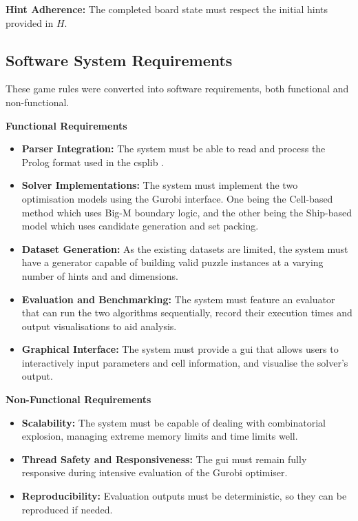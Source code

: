 \textbf{Hint Adherence:} The completed board state must respect the initial hints provided in $H$.


\subsection{Software System Requirements}\label{subsec:software-sys-requirements}
These game rules were converted into software requirements, both functional and non-functional.

\textbf{Functional Requirements}
\begin{itemize}
    \item \textbf{Parser Integration:} The system must be able to read and process the Prolog format used in the \gls{csplib} \citep{csplib:prob014}.
    \item \textbf{Solver Implementations:} The system must implement the two optimisation models using the Gurobi interface. One being the Cell-based method which uses Big-M boundary logic, and the other being the Ship-based model which uses candidate generation and set packing.
    \item \textbf{Dataset Generation:} As the existing datasets are limited, the system must have a generator capable of building valid puzzle instances at a varying number of hints and and dimensions.
    \item \textbf{Evaluation and Benchmarking:} The system must feature an evaluator that can run the two algorithms sequentially, record their execution times and output visualisations to aid analysis.
    \item \textbf{Graphical Interface:} The system must provide a \gls{gui} that allows users to interactively input parameters and cell information, and visualise the solver's output.
\end{itemize}

\textbf{Non-Functional Requirements}
\begin{itemize}
    \item \textbf{Scalability:} The system must be capable of dealing with combinatorial explosion, managing extreme memory limits and time limits well.
    \item \textbf{Thread Safety and Responsiveness:} The \gls{gui} must remain fully responsive during intensive evaluation of the Gurobi optimiser.
    \item \textbf{Reproducibility:} Evaluation outputs must be deterministic, so they can be reproduced if needed.
\end{itemize}

